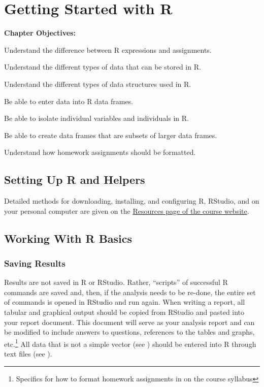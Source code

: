 \documentclass[10pt,openany]{book}\usepackage[]{graphicx}\usepackage[]{color}
\begin{document}
\chapter{Getting Started with R} \label{chap:FoundationsR}
\begin{ChapObj}{\boxwidth}
  \textbf{Chapter Objectives:}
  \begin{Enumerate}
    \item Understand the difference between R expressions and assignments.
    \item Understand the different types of data that can be stored in R.
    \item Understand the different types of data structures used in R.
    \item Be able to enter data into R data frames.
    \item Be able to isolate individual variables and individuals in R.
    \item Be able to create data frames that are subsets of larger data frames.
    \item Understand how homework assignments should be formatted.
  \end{Enumerate}
\end{ChapObj}

\minitoc
\newpage

\section{Setting Up R and Helpers} \label{sect:RSetup}
\vspace{-8pt}
Detailed methods for downloading, installing, and configuring R, RStudio, and  on your personal computer are given on the \href{http://derekogle.com/NCMTH107/resources/}{Resources page of the course website}.

\vspace{-8pt}
\section{Working With R Basics} \label{sect:RBasics}
\vspace{-12pt}
\subsection{Saving Results} \label{sect:RSaving}
Results are not saved in R or RStudio.  Rather, ``scripts'' of successful R commands are saved and, then, if the analysis needs to be re-done, the entire set of commands is opened in RStudio and run again.  When writing a report, all tabular and graphical output should be copied from RStudio and pasted into your report document.  This document will serve as your analysis report and can be modified to include answers to questions, references to the tables and graphs, etc.\footnote{Specifics for how to format homework assignments in on the course syllabus}  All data that is not a simple vector (see ) should be entered into R through text files (see ).
\end{document}
